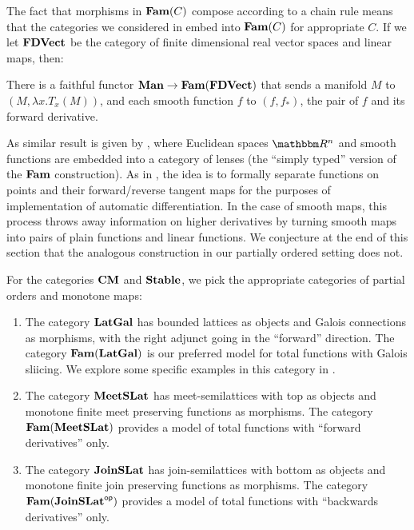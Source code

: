 The fact that morphisms in $\mathbf{Fam}(C)$ compose according to a chain rule
means that the categories we considered in 
embed into $\mathbf{Fam}(C)$ for appropriate $C$. If we let $\mathbf{FDVect}$ be the
category of finite dimensional real vector spaces and linear maps,
then:

\begin{proposition}
  \label{prop:embed-manifolds}
  There is a faithful functor $\mathbf{Man} \to \mathbf{Fam}(\mathbf{FDVect})$ that sends a
  manifold $M$ to $(M, \lambda x. T_x(M))$, and each smooth function
  $f$ to $(f, f_*)$, the pair of $f$ and its forward derivative.
\end{proposition}

As similar result is given by \citet{cruttwell2022}, where Euclidean
spaces $\RR^n$ and smooth functions are embedded into a category of
lenses (the ``simply typed'' version of the $\mathbf{Fam}$ construction). As
in \citet{vakar22}, the idea is to formally separate functions on
points and their forward/reverse tangent maps for the purposes of
implementation of automatic differentiation. In the case of smooth
maps, this process throws away information on higher derivatives by
turning smooth maps into pairs of plain functions and linear
functions. We conjecture at the end of this section that the analogous
construction in our partially ordered setting does not.

For the categories $\mathbf{CM}$ and $\mathbf{Stable}$, we pick the appropriate
categories of partial orders and monotone maps:

\begin{enumerate}
\item The category $\mathbf{LatGal}$ has bounded lattices as objects and
  Galois connections as morphisms, with the right adjunct going in
  the ``forward'' direction. The category $\mathbf{Fam}(\mathbf{LatGal})$ is our
  preferred model for total functions with Galois sliicing. We
  explore some specific examples in this category in
  .
\item The category $\mathbf{MeetSLat}$ has meet-semilattices with top as
  objects and monotone finite meet preserving functions as
  morphisms. The category $\mathbf{Fam}(\mathbf{MeetSLat})$ provides a model of
  total functions with ``forward derivatives'' only.
\item The category $\mathbf{JoinSLat}$ has join-semilattices with bottom as
  objects and monotone finite join preserving functions as
  morphisms. The category $\mathbf{Fam}(\mathbf{JoinSLat}^{\mathsf{op}})$ provides a model of
  total functions with ``backwards derivatives'' only.
\end{enumerate}

